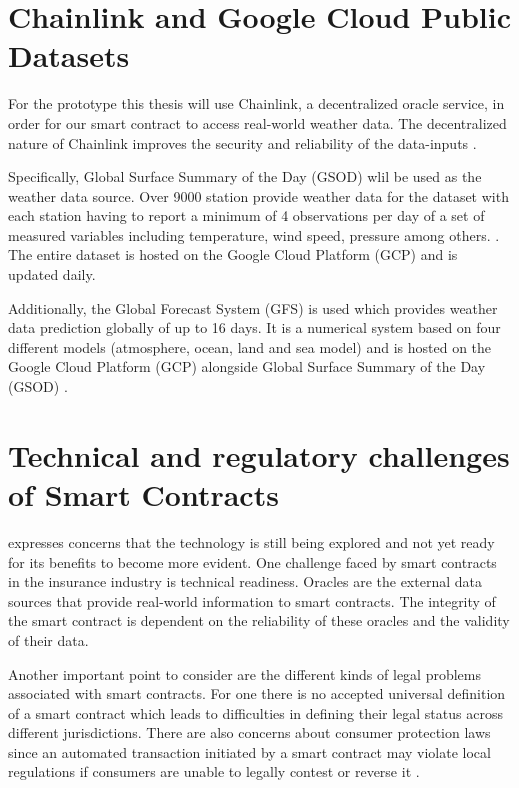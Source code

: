 \section{Chainlink and Google Cloud Public Datasets}\label{section:chainlink_google_cloud_datasets}

For the prototype this thesis will use Chainlink, a decentralized oracle service, in order for our smart contract to access real-world weather data. The decentralized nature of Chainlink improves the security and reliability of the data-inputs \autocite{beniiche2020study}.

Specifically, Global Surface Summary of the Day (GSOD) wlil be used as the weather data source. Over 9000 station provide weather data for the dataset with each station having to report a minimum of 4 observations per day of a set of measured variables including temperature, wind speed, pressure among others. \autocite{NOAA_GSOD_2023}. The entire dataset is hosted on the Google Cloud Platform (GCP) and is updated daily.

Additionally, the Global Forecast System (GFS) is used which provides weather data prediction globally of up to 16 days. It is a numerical system based on four different models (atmosphere, ocean, land and sea model) and is hosted on the Google Cloud Platform (GCP) alongside Global Surface Summary of the Day (GSOD) \autocite{NOAA_GSOD_nd}.

\section{Technical and regulatory challenges of Smart Contracts}\label{section:regulatory_technical_challenges}

\autocite{gatteschi2018blockchain} expresses concerns that the technology is still being explored and not yet ready for its benefits to become more evident. One challenge faced by smart contracts in the insurance industry is technical readiness. Oracles are the external data sources that provide real-world information to smart contracts. The integrity of the smart contract is dependent on the reliability of these oracles and the validity of their data. 

Another important point to consider are the different kinds of legal problems associated with smart contracts. For one there is no accepted universal definition of a smart contract which leads to difficulties in defining their legal status across different jurisdictions. There are also concerns about consumer protection laws since an automated transaction initiated by a smart contract may violate local regulations if consumers are unable to legally contest or reverse it \autocite{ferreira2021regulating}.